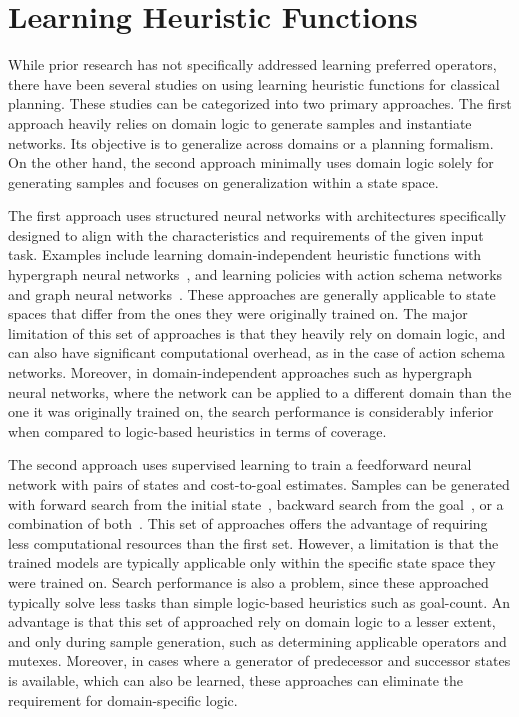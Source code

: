 \documentclass[ppgc,diss,english]{iiufrgs}
\newcommand{\pp}[2][noinline]{\todo[color=purple!50,linecolor={purple!100},#1,fancyline,author=Pedro]{#2}}
\begin{document}
\section{Learning Heuristic Functions}
\label{sec:related-h}
While prior research has not specifically addressed learning preferred operators, there have been several studies on using learning heuristic functions for classical planning. These studies can be categorized into two primary approaches.
The first approach heavily relies on domain logic to generate samples and instantiate networks. Its objective is to generalize across domains or a planning formalism.
On the other hand, the second approach minimally uses domain logic solely for generating samples and focuses on generalization within a state space.

The first approach uses structured neural networks with architectures specifically designed to align with the characteristics and requirements of the given input task. Examples include learning domain-independent heuristic functions with hypergraph neural networks~\cite{Shen.etal/2020}, and learning policies with action schema networks~\cite{Toyer.etal/2018,Toyer.etal/2020} and graph neural networks~\cite{Stahlberg.etal/2022}. These approaches are generally applicable to state spaces that differ from the ones they were originally trained on. The major limitation of this set of approaches is that they heavily rely on domain logic, and can also have significant computational overhead, as in the case of action schema networks. Moreover, in domain-independent approaches such as hypergraph neural networks, where the network can be applied to a different domain than the one it was originally trained on, the search performance is considerably inferior when compared to logic-based heuristics in terms of coverage. %

The second approach uses supervised learning to train a feedforward neural network with pairs of states and cost-to-goal estimates. Samples can be generated with forward search from the initial state~\cite{Ferber.etal/2020a}, backward search from the goal~\cite{Yu.etal/2020,OToole/2022,Bettker.etal/2022}, or a combination of both~\cite{Ferber.etal/2022}.
This set of approaches offers the advantage of requiring less computational resources than the first set. However, a limitation is that the trained models are typically applicable only within the specific state space they were trained on. Search performance is also a problem, since these approached typically solve less tasks than simple logic-based heuristics such as goal-count. An advantage is that this set of approached rely on domain logic to a lesser extent, and only during sample generation, such as determining applicable operators and mutexes. Moreover, in cases where a generator of predecessor and successor states is available, which can also be learned, these approaches can eliminate the requirement for domain-specific logic.%
\end{document}
